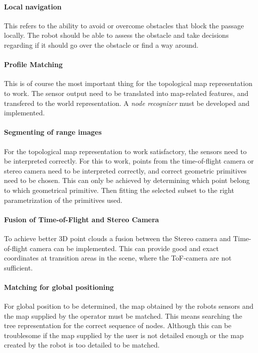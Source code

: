 \paragraph{Local navigation} This refers to the ability to avoid or overcome obstacles
that block the passage locally. The robot should be able to assess the obstacle and take
decisions regarding if it should go over the obstacle or find a way around. 

\paragraph{Profile Matching} This is of course the most important thing for the
topological map representation to work. The sensor output need to be translated into 
map-related features, and transfered to the world representation. A \emph{node recognizer}
must be developed and implemented.

\paragraph{Segmenting of range images} For the topological map representation to work
satisfactory, the sensors need to be interpreted correctly. For this to work, points from
the time-of-flight camera or stereo camera need to be interpreted correctly, and correct
geometric primitives need to be chosen.  This can only
be achieved by determining which point belong to which geometrical primitive. Then fitting
the selected subset to the right parametrization of the primitives used. 

\paragraph{Fusion of Time-of-Flight and Stereo Camera} To achieve better 3D point clouds
a fusion between the Stereo camera and Time-of-flight camera can be implemented. This can
provide good and exact coordinates at transition areas in the scene, where the ToF-camera
are not sufficient. 


\paragraph{Matching for global positioning} For global position to be determined, the map
obtained by the robots sensors and the map supplied by the operator must be matched. This
means searching the tree representation for the correct sequence of nodes. Although this
can be troublesome if the map supplied by the user is not detailed enough or the map
created by the robot is too detailed to be matched. 

